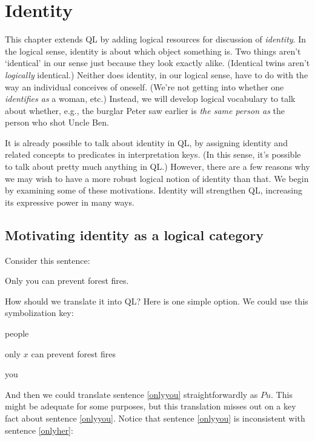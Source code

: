 \chapter{Identity}
\label{ch.identity}

This chapter extends QL by adding logical resources for discussion of \emph{identity}. In the logical sense, identity is about which object something is. Two things aren't `identical' in our sense just because they look exactly alike. (Identical twins aren't \emph{logically} identical.) Neither does identity, in our logical sense, have to do with the way an individual conceives of oneself. (We're not getting into whether one \emph{identifies as} a woman, etc.) Instead, we will develop logical vocabulary to talk about whether, e.g., the burglar Peter saw earlier is \emph{the same person as} the person who shot Uncle Ben.

It is already possible to talk about identity in QL, by assigning identity and related concepts to predicates in interpretation keys. (In this sense, it's possible to talk about pretty much anything in QL.) However, there are a few reasons why we may wish to have a more robust logical notion of identity than that. We begin by examining some of these motivations. Identity will strengthen QL, increasing its expressive power in many ways.

\section{Motivating identity as a logical category}
\label{sec.identitymotivation}

Consider this sentence:

\begin{earg}
\item[\ex{onlyyou}] Only you can prevent forest fires.
\end{earg}

How should we translate it into QL? Here is one simple option. We could use this symbolization key:

\begin{ekey}
\item[UD:] people
\item[Px:] only $x$ can prevent forest fires
\item[u:] you
\end{ekey}

And then we could translate sentence \ref{onlyyou} straightforwardly as $Pu$. This might be adequate for some purposes, but this translation misses out on a key fact about sentence \ref{onlyyou}. Notice that sentence \ref{onlyyou} is inconsistent with sentence \ref{onlyher}:

